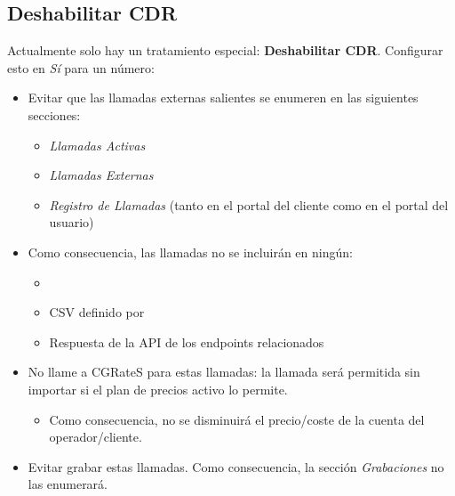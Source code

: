 \documentclass[letterpaper,10pt,spanish]{sphinxmanual}
\begin{document}
\subsection{Deshabilitar CDR}
\label{administration_portal/platform/global_special_numbers:disable-cdr}
Actualmente solo hay un tratamiento especial: \textbf{Deshabilitar CDR}. Configurar esto en \emph{Sí} para un número:
\begin{itemize}
\item {} 
Evitar que las llamadas externas salientes se enumeren en las siguientes secciones:
\begin{itemize}
\item {} 
\emph{Llamadas Activas}

\item {} 
\emph{Llamadas Externas}

\item {} 
\emph{Registro de Llamadas} (tanto en el portal del cliente como en el portal del usuario)

\end{itemize}

\item {} 
Como consecuencia, las llamadas no se incluirán en ningún:
\begin{itemize}
\item {} 
{\hyperref[administration_portal/brand/invoicing/invoices:invoices]{}}

\item {} 
CSV definido por {\hyperref[administration_portal/brand/calls/call_csv_schedulers:call\string-csv\string-schedulers]{}}

\item {} 
Respuesta de la API de los endpoints relacionados

\end{itemize}

\item {} 
No llame a CGRateS para estas llamadas: la llamada será permitida sin importar si el plan de precios activo lo permite.
\begin{itemize}
\item {} 
Como consecuencia, no se disminuirá el precio/coste de la cuenta del operador/cliente.

\end{itemize}

\item {} 
Evitar grabar estas llamadas. Como consecuencia, la sección \emph{Grabaciones} no las enumerará.

\end{itemize}
\end{document}
